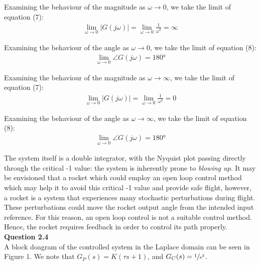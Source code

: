 \documentclass{article}
\begin{document}
	Examining the behaviour of the magnitude as $\omega \to 0$, we take the limit of equation (7):
	\begin{align*}
		\lim_{\omega\to 0}|G(j \omega)| = \lim_{\omega\to 0}\frac{1}{\omega^2} = \infty
	\end{align*}
	
	Examining the behaviour of the angle as $\omega \to 0$, we take the limit of equation (8):
	\begin{align*}
		\lim_{\omega\to 0}\angle G(j \omega) = 180 \si{\degree}
	\end{align*}
	
	Examining the behaviour of the magnitude as $\omega \to \infty$, we take the limit of equation (7):
	\begin{align*}
		\lim_{\omega\to 0}|G(j \omega)| = \lim_{\omega\to 0}\frac{1}{\omega^2} = 0
	\end{align*}
	
	Examining the behaviour of the angle as $\omega \to \infty$, we take the limit of equation (8):
	\begin{align*}
		\lim_{\omega\to 0}\angle G(j \omega) = 180 \si{\degree}
	\end{align*}
	
	The system itself is a double integrator, with the Nyquist plot passing directly through the critical -1 value: the system is inherently prone to \textit{blowing up}. It may be envisioned that a rocket which could employ an open loop control method which may help it to avoid this critical -1 value and provide safe flight, however, a rocket is a system that experiences many stochastic perturbations during flight. These perturbations could move the rocket output angle from the intended input reference. For this reason, an open loop control is not a suitable control method. Hence, the rocket requires feedback in order to control its path properly.\\
	


    \textbf{Question 2.4}\\
    
    A block doagram of the controlled system in the Laplace domain can be seen in Figure 1. We note that $G_P(s) = K(\tau s + 1)$, and $G_C(s) = \sfrac{1}{s^2}$.
    
\end{document}
